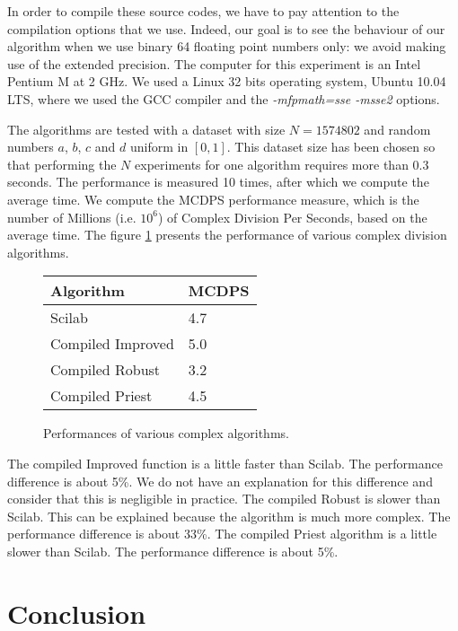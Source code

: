 \documentclass{paper}
\begin{document}
In order to compile these source codes, we have to pay attention to the 
compilation options that we use. 
Indeed, our goal is to see the behaviour of our algorithm when we 
use binary 64 floating point numbers only: we avoid making use of the extended precision. 
The computer for this experiment is an Intel Pentium M at 2 GHz. 
We used a Linux 32 bits operating system, Ubuntu 10.04 LTS, 
where we used the GCC compiler and the \emph{-mfpmath=sse -msse2} options. 

The algorithms are tested with a dataset with size $N=1574802$ and 
random numbers $a$, $b$, $c$ and $d$ uniform in $[0,1]$. 
This dataset size has been chosen so that performing the $N$ experiments for 
one algorithm requires more than 0.3 seconds. 
The performance is measured 10 times, after which we compute the 
average time.
We compute the MCDPS performance measure, which is the number of 
Millions (i.e. $10^6$) of Complex Division Per Seconds, 
based on the average time.
The figure \ref{fig-perfcompdivMCDPS} presents the performance of 
various complex division algorithms.


\begin{figure}
\caption{
Performances of various complex algorithms. 
}
\label{fig-perfcompdivMCDPS}
\begin{center}
\begin{tabular}{|l|l|}
\hline
\textbf{Algorithm} & \textbf{MCDPS} \\
\hline
Scilab             & 4.7 \\
Compiled Improved  & 5.0 \\
Compiled Robust    & 3.2 \\
Compiled Priest    & 4.5 \\
\hline
\end{tabular}
\end{center}
\end{figure}

The compiled Improved function is a little faster 
than Scilab. 
The performance difference is about 5\%. 
We do not have an explanation for this difference and consider that this 
is negligible in practice.
The compiled Robust is slower than Scilab.  
This can be explained because the algorithm is much more 
complex. 
The performance difference is about 33\%.
The compiled Priest algorithm is a little slower than Scilab. 
The performance difference is about 5\%.


\section{Conclusion}
\end{document}
